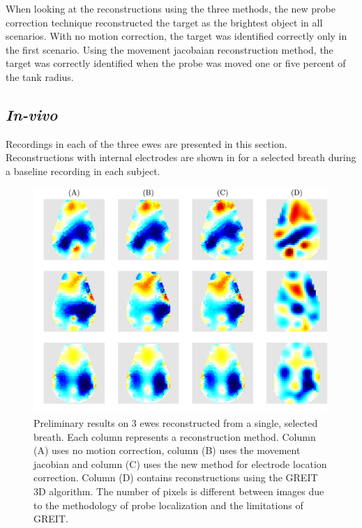 When looking at the reconstructions using the three methods, the new probe correction technique
reconstructed the target as the brightest object in all scenarios. With no motion correction, the 
target was identified correctly only in the first scenario. Using the movement jacobaian 
reconstruction method, the target was correctly identified when the probe was moved one or five percent
of the tank radius. 

\subsection{\emph{In-vivo}}
Recordings in each of the three ewes are presented in this section.
Reconstructions with internal electrodes are shown in
 for a selected breath during a 
baseline recording in each subject.

\begin{figure}
    \centering
	\includegraphics[width=\textwidth]{chapter7-internal_elec_motion/imgs/lamb_reconstruction_all.pdf} 
	\caption[Results of the probe location correction]{\label{fig:internal_reconstructions} 
	Preliminary results on 3 ewes reconstructed 
	from a single, selected breath. Each column represents a reconstruction method. Column (A)
	uses no motion correction, column (B) uses the movement jacobian and column (C) uses the new method
	for electrode location correction. Column (D) contains reconstructions using the GREIT 3D algorithm.
	The number of pixels is different between images due to the methodology of probe localization and 
	the limitations of GREIT.}
\end{figure}

